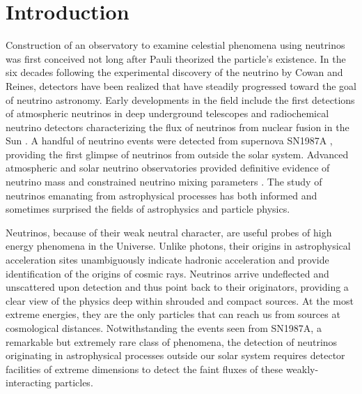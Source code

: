 
\section{Introduction}
\label{sec:intro}

Construction of an observatory to examine celestial phenomena using
neutrinos was first conceived not long after Pauli theorized the
particle's existence.  In the six decades following the experimental
discovery of the neutrino by Cowan and Reines, detectors have been realized
that have steadily progressed toward the goal of neutrino
astronomy.  Early developments in the field include the first detections of
atmospheric neutrinos in deep underground telescopes \cite{Witwatersrand,KGF} and
radiochemical neutrino detectors characterizing the flux of neutrinos from
nuclear fusion in the Sun \cite{Homestake, GALLEX}. A handful of neutrino
events were detected from supernova SN1987A
\cite{SK1987A,IMB1987A,BUST1987A}, providing the first glimpse of neutrinos
from outside the solar system.  Advanced
atmospheric and solar neutrino observatories provided definitive
evidence of neutrino mass and constrained neutrino mixing
parameters \cite{SK,SNO}.  The study of neutrinos emanating from astrophysical
processes has both informed and sometimes surprised the fields of
astrophysics and particle physics. 

Neutrinos, because of their weak neutral character, are useful probes of high
energy phenomena in the Universe. Unlike photons, their origins in astrophysical
acceleration sites unambiguously indicate hadronic acceleration and
provide identification of the origins of cosmic rays. Neutrinos arrive 
undeflected and unscattered upon detection and thus point back to their
originators, providing
a clear view of the physics deep within shrouded and compact sources. At
the most extreme energies, they are the only particles that can reach 
us from sources at cosmological distances. Notwithstanding the events seen from SN1987A, a remarkable but
extremely rare class of phenomena, the detection of neutrinos originating in
astrophysical processes outside our solar system requires detector facilities of
extreme dimensions to detect the faint fluxes of these weakly-interacting
particles. 

